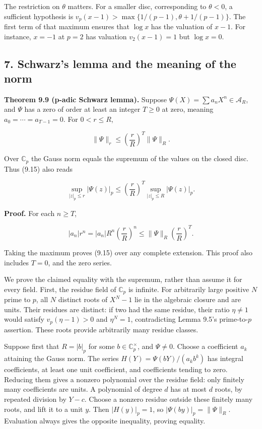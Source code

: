 \documentclass[
  11pt,
  a4paper,
]{article}
\begin{document}
The restriction on \(\theta\) matters. For a smaller disc, corresponding
to \(\theta<0\), a sufficient hypothesis is
\(v_p(x-1)>\max\{1/(p-1),\theta+1/(p-1)\}\). The first term of that
maximum ensures that \(\log x\) has the valuation of \(x-1\). For
instance, \(x=-1\) at \(p=2\) has valuation \(v_2(x-1)=1\) but
\(\log x=0\).

\subsection{7. Schwarz's lemma and the meaning of the
norm}\label{schwarzs-lemma-and-the-meaning-of-the-norm}

\textbf{Theorem 9.9 (p-adic Schwarz lemma).} Suppose
\(\Psi(X)=\sum a_nX^n\in\mathcal A_R\), and \(\Psi\) has a zero of order
at least an integer \(T\ge0\) at zero, meaning \(a_0=\cdots=a_{T-1}=0\).
For \(0<r\le R\),

\[
\|\Psi\|_r\le\left(\frac rR\right)^T\|\Psi\|_R.
\tag{9.15}
\]

Over \(\mathbb C_p\) the Gauss norm equals the supremum of the values on
the closed disc. Thus (9.15) also reads

\[
\sup_{|z|_p\le r}|\Psi(z)|_p
\le\left(\frac rR\right)^T\sup_{|z|_p\le R}|\Psi(z)|_p.
\tag{9.16}
\]

\textbf{Proof.} For each \(n\ge T\),

\[
|a_n|r^n=|a_n|R^n\left(\frac rR\right)^n
\le\|\Psi\|_R\left(\frac rR\right)^T.
\]

Taking the maximum proves (9.15) over any complete extension. This proof
also includes \(T=0\), and the zero series.

We prove the claimed equality with the supremum, rather than assume it
for every field. First, the residue field of \(\mathbb C_p\) is
infinite. For arbitrarily large positive \(N\) prime to \(p\), all \(N\)
distinct roots of \(X^N-1\) lie in the algebraic closure and are units.
Their residues are distinct: if two had the same residue, their ratio
\(\eta\ne1\) would satisfy \(v_p(\eta-1)>0\) and \(\eta^N=1\),
contradicting Lemma 9.5's prime-to-\(p\) assertion. These roots provide
arbitrarily many residue classes.

Suppose first that \(R=|b|_p\) for some \(b\in\mathbb C_p^\times\), and
\(\Psi\ne0\). Choose a coefficient \(a_k\) attaining the Gauss norm. The
series \(H(Y)=\Psi(bY)/(a_kb^k)\) has integral coefficients, at least
one unit coefficient, and coefficients tending to zero. Reducing them
gives a nonzero polynomial over the residue field: only finitely many
coefficients are units. A polynomial of degree \(d\) has at most \(d\)
roots, by repeated division by \(Y-c\). Choose a nonzero residue outside
these finitely many roots, and lift it to a unit \(y\). Then
\(|H(y)|_p=1\), so \(|\Psi(by)|_p=\|\Psi\|_R\). Evaluation always gives
the opposite inequality, proving equality.
\end{document}
